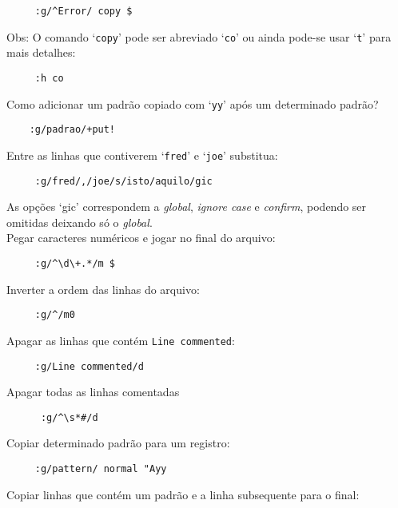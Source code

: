 \begin{verbatim}
     :g/^Error/ copy $
\end{verbatim}

Obs: O comando `{\tt copy}' pode ser abreviado `{\tt co}' ou ainda pode-se usar `{\tt t}'
para mais detalhes:

\begin{verbatim}
     :h co
\end{verbatim}

Como adicionar um padrão copiado com `{\tt yy}' após um determinado padrão?

\begin{verbatim}
    :g/padrao/+put!
\end{verbatim}

Entre as linhas que contiverem `{\tt fred}' e `{\tt joe}' substitua:

\begin{verbatim}
     :g/fred/,/joe/s/isto/aquilo/gic
\end{verbatim}

As opções `gic' correspondem a {\em global}, {\em ignore case} e {\em
confirm}, podendo ser omitidas deixando só o {\em global}. \\


Pegar caracteres numéricos e jogar no final do arquivo:

\begin{verbatim}
     :g/^\d\+.*/m $
\end{verbatim}

Inverter a ordem das linhas do arquivo:

\begin{verbatim}
     :g/^/m0
\end{verbatim}

Apagar as linhas que contém {\tt Line commented}:

\begin{verbatim}
     :g/Line commented/d
\end{verbatim}

Apagar todas as linhas comentadas

\begin{verbatim}
      :g/^\s*#/d
\end{verbatim}

Copiar determinado padrão para um registro:

\begin{verbatim}
     :g/pattern/ normal "Ayy
\end{verbatim}

Copiar linhas que contém um padrão e a linha subsequente para o final:

